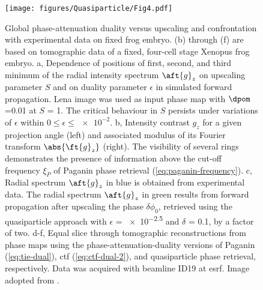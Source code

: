 \documentclass[
twoside,
openright,
titlepage,
numbers=noenddot,
headinclude,
fleqn,
a4paper,
footinclude=true,
cleardoublepage=empty,
abstractoff,
BCOR=5mm,
paper=a4,
fontsize=11pt,
british,ngerman,american,
]{scrreprt}
\begin{document}
\begin{figure}
  \centering
  \texttt{[image: figures/Quasiparticle/Fig4.pdf]}
  \caption[Global phase-attenuation duality versus upscaling and
  confrontation with experimental data on fixed frog embryo.]{Global
    phase-attenuation duality versus upscaling and confrontation with
    experimental data on fixed frog embryo.  (b) through (f) are based
    on tomographic data of a fixed, four-cell stage Xenopus frog
    embryo.  a, Dependence of positions of first, second, and third
    minimum of the radial intensity spectrum $\aft{g}_z$ on upscaling
    parameter $S$ and on duality parameter $\epsilon$ in simulated
    forward propagation.  Lena image was used as input phase map
    with $\dpom$=\num{0.01} at $S$ = \num{1}.  The critical behaviour
    in $S$ persists under variations of $\epsilon$ within
    $0\le\epsilon\le\num{e-2}$.  b, Intensity contrast $g_z$ for a
    given projection angle (left) and associated modulus of its
    Fourier transform $\abs{\ft{g}_z}$ (right).  The visibility of
    several rings demonstrates the presence of information above the
    cut-off frequency $\xi_P$ of Paganin phase retrieval
    (\cref{eq:paganin-frequency}).  c, Radial spectrum $\aft{g}_z$ in
    blue is obtained from experimental data.  The radial spectrum
    $\aft{g}_z$ in green results from forward propagation after
    upscaling the phase $\delta\phi_0$, retrieved using the
    quasiparticle approach with $\epsilon$ = \num{e-2.5} and $\delta$
    = \num{0.1}, by a factor of two.  d-f, Equal slice through
    tomographic reconstructions from phase maps using the
    phase-attenuation-duality versions of Paganin
    (\cref{eq:tie-dual}), \ac{ctf} (\cref{eq:ctf-dual-2}), and
    quasiparticle phase retrieval, respectively.  Data was acquired
    with beamline ID19 at \ac{esrf}.  Image adopted from
    \cite{Hofmann2014}.}
  \label{fig:qp-4}
\end{figure}
\end{document}
